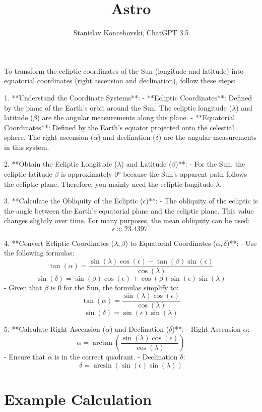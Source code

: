 \documentclass[12pt,a4paper]{article}
\author{Stanislav Koncebovski, ChatGPT 3.5}
\title{Astro}
\begin{document}
	\maketitle
	
	To transform the ecliptic coordinates of the Sun (longitude and latitude) into equatorial coordinates (right ascension and declination), follow these steps:
	
	1. **Understand the Coordinate Systems**:
	- **Ecliptic Coordinates**: Defined by the plane of the Earth's orbit around the Sun. The ecliptic longitude (\(\lambda\)) and latitude (\(\beta\)) are the angular measurements along this plane.
	- **Equatorial Coordinates**: Defined by the Earth's equator projected onto the celestial sphere. The right ascension (\(\alpha\)) and declination (\(\delta\)) are the angular measurements in this system.
	
	2. **Obtain the Ecliptic Longitude (\(\lambda\)) and Latitude (\(\beta\))**:
	- For the Sun, the ecliptic latitude \(\beta\) is approximately 0° because the Sun's apparent path follows the ecliptic plane. Therefore, you mainly need the ecliptic longitude \(\lambda\).
	
	3. **Calculate the Obliquity of the Ecliptic (\(\epsilon\))**:
	- The obliquity of the ecliptic is the angle between the Earth's equatorial plane and the ecliptic plane. This value changes slightly over time. For many purposes, the mean obliquity can be used:
	\[
	\epsilon \approx 23.4397^\circ
	\]
	
	4. **Convert Ecliptic Coordinates (\(\lambda, \beta\)) to Equatorial Coordinates (\(\alpha, \delta\))**:
	- Use the following formulas:
	\[
	\tan(\alpha) = \frac{\sin(\lambda) \cos(\epsilon) - \tan(\beta) \sin(\epsilon)}{\cos(\lambda)}
	\]
	\[
	\sin(\delta) = \sin(\beta) \cos(\epsilon) + \cos(\beta) \sin(\epsilon) \sin(\lambda)
	\]
	- Given that \(\beta\) is 0 for the Sun, the formulas simplify to:
	\[
	\tan(\alpha) = \frac{\sin(\lambda) \cos(\epsilon)}{\cos(\lambda)}
	\]
	\[
	\sin(\delta) = \sin(\epsilon) \sin(\lambda)
	\]
	
	5. **Calculate Right Ascension (\(\alpha\)) and Declination (\(\delta\))**:
	- Right Ascension \(\alpha\):
	\[
	\alpha = \arctan \left( \frac{\sin(\lambda) \cos(\epsilon)}{\cos(\lambda)} \right)
	\]
	- Ensure that \(\alpha\) is in the correct quadrant.
	- Declination \(\delta\):
	\[
	\delta = \arcsin (\sin(\epsilon) \sin(\lambda))
	\]
	
	\section{Example Calculation} 
	
\end{document}
